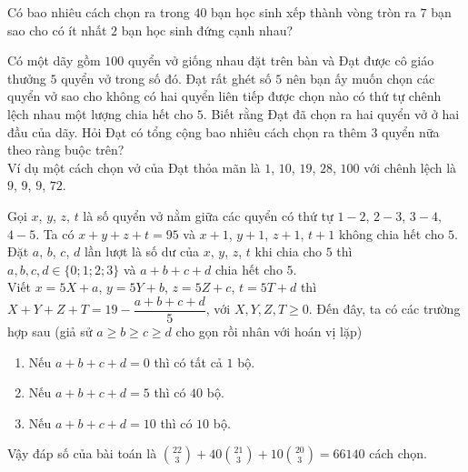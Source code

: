 \begin{bt}%
 Có bao nhiêu cách chọn ra trong $40$ bạn học sinh xếp thành vòng tròn ra $7$ bạn sao cho có ít nhất $2$ bạn học sinh đứng cạnh nhau?
\end{bt}

\begin{bt}%
 Có một dãy gồm $100$ quyển vở giống nhau đặt trên bàn và Đạt được cô giáo thưởng $5$ quyển vở trong số đó. Đạt rất ghét số $5$ nên bạn ấy muốn chọn các quyển vở sao cho không có hai quyển liên tiếp được chọn nào có thứ tự chênh lệch nhau một lượng chia hết cho $5$. Biết rằng Đạt đã chọn ra hai quyển vở ở hai đầu của dãy. Hỏi Đạt có tổng cộng bao nhiêu cách chọn ra thêm $3$ quyển nữa theo ràng buộc trên?\\
 Ví dụ một cách chọn vở của Đạt thỏa mãn là $1$, $10$, $19$, $28$, $100$ với chênh lệch là $9$, $9$, $9$, $72$.
 \loigiai
 {
 Gọi $x$, $y$, $z$, $t$ là số quyển vở nằm giữa các quyển có thứ tự $1-2$, $2-3$, $3-4$, $4-5$. Ta có $x+y+z+t=95$ và $x+1$, $y+1$, $z+1$, $t+1$ không chia hết cho $5$.\\
 Đặt $a$, $b$, $c$, $d$ lần lượt là số dư của $x$, $y$, $z$, $t$ khi chia cho $5$ thì $a,b,c,d\in \{0;1;2;3\}$ và $a+b+c+d$ chia hết cho $5$.\\
 Viết $x=5X+a$, $y=5Y+b$, $z=5Z+c$, $t=5T+d$ thì $X+Y+Z+T=19-\dfrac{a+b+c+d}{5}$, với $X,Y,Z,T\ge 0$. Đến đây, ta có các trường hợp sau (giả sử $a\ge b\ge c\ge d$ cho gọn rồi nhân với hoán vị lặp)
 \begin{enumerate}[(1)]
 	\item Nếu $a+b+c+d=0$ thì có tất cả $1$ bộ.
 	\item Nếu $a+b+c+d=5$ thì có $40$ bộ.
 	\item Nếu $a+b+c+d=10$ thì có $10$ bộ. 
 \end{enumerate}
 Vậy đáp số của bài toán là $\displaystyle\binom{22}{3}+40\binom{21}{3}+10\binom{20}{3}=66140$ cách chọn.
 }
\end{bt}

